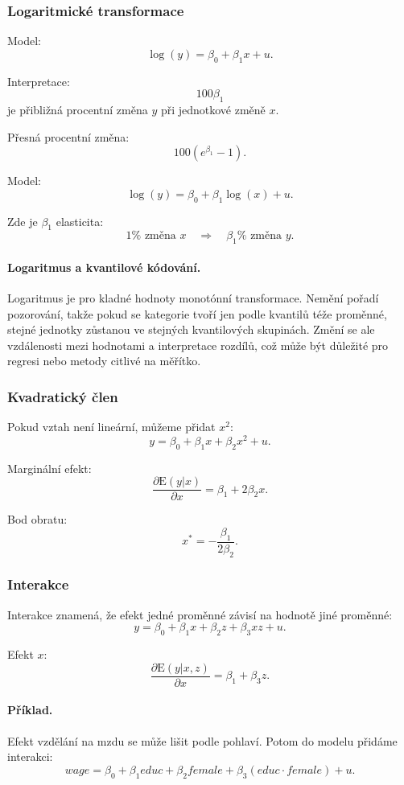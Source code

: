 \subsubsection{Logaritmické transformace}

Model:
\[
\log(y)=\beta_0+\beta_1x+u.
\]

Interpretace:
\[
100\beta_1
\]
je přibližná procentní změna $y$ při jednotkové změně $x$.

Přesná procentní změna:
\[
100(e^{\beta_1}-1).
\]

Model:
\[
\log(y)=\beta_0+\beta_1\log(x)+u.
\]

Zde je $\beta_1$ elasticita:
\[
1\% \text{ změna } x
\quad \Rightarrow \quad
\beta_1\% \text{ změna } y.
\]

\paragraph{Logaritmus a kvantilové kódování.}
Logaritmus je pro kladné hodnoty monotónní transformace. Nemění pořadí pozorování, takže pokud se
kategorie tvoří jen podle kvantilů téže proměnné, stejné jednotky zůstanou ve stejných kvantilových
skupinách. Změní se ale vzdálenosti mezi hodnotami a interpretace rozdílů, což může být důležité pro
regresi nebo metody citlivé na měřítko.

\subsubsection{Kvadratický člen}

Pokud vztah není lineární, můžeme přidat $x^2$:
\[
y=\beta_0+\beta_1x+\beta_2x^2+u.
\]

Marginální efekt:
\[
\frac{\partial \mathrm{E}(y|x)}{\partial x}
=
\beta_1+2\beta_2x.
\]

Bod obratu:
\[
x^*=-\frac{\beta_1}{2\beta_2}.
\]

\subsubsection{Interakce}

Interakce znamená, že efekt jedné proměnné závisí na hodnotě jiné proměnné:
\[
y=\beta_0+\beta_1x+\beta_2z+\beta_3xz+u.
\]

Efekt $x$:
\[
\frac{\partial \mathrm{E}(y|x,z)}{\partial x}
=
\beta_1+\beta_3z.
\]

\paragraph{Příklad.}
Efekt vzdělání na mzdu se může lišit podle pohlaví. Potom do modelu přidáme interakci:
\[
wage=\beta_0+\beta_1educ+\beta_2female+\beta_3(educ\cdot female)+u.
\]

